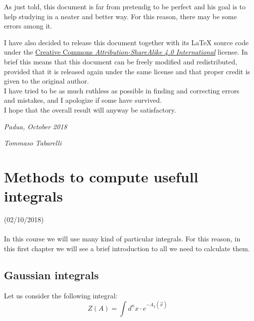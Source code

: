 \documentclass[12pt, english, a4paper]{book}
\begin{document}
As just told, this document is far from pretendig to be perfect and his goal is to help studying in a neater and better way. For this reason, there may be some errors among it.

I have also decided to release this document together with its \LaTeX{} source code under the \href{http://creativecommons.org/licenses/by-sa/4.0/}{\color{blue}Creative Commons \emph{Attribution-ShareAlike 4.0 International}} license. In brief this means that this document can be freely modified and redistributed, provided that it is released again under the same license and that proper credit is given to the original author.\\

I have tried to be as much ruthless as possible in finding and correcting errors and mistakes, and I apologize if some have survived.\\

I hope that the overall result will anyway be satisfactory.

\vspace{2em}

\hfill \emph{Padua, October 2018}

\hfill \emph{Tommaso Tabarelli}

\newpage
\thispagestyle{empty}
\let\cleardoublepage\clearpage

\tableofcontents
{}

\chapter{Methods to compute usefull integrals}

\hspace*{\fill} (02/10/2018) \\ \\
In this course we will use many kind of particular integrals. For this reason, in this first chapter we will see a brief introduction to all we need to calculate them.

\section{Gaussian integrals}

Let us consider the following integral:\\

\begin{equation}\label{Gaussian Integral}
Z(A) = \int d^{n}x \cdot e^{ -A_2(\vec{x}) }
\end{equation}
\end{document}
